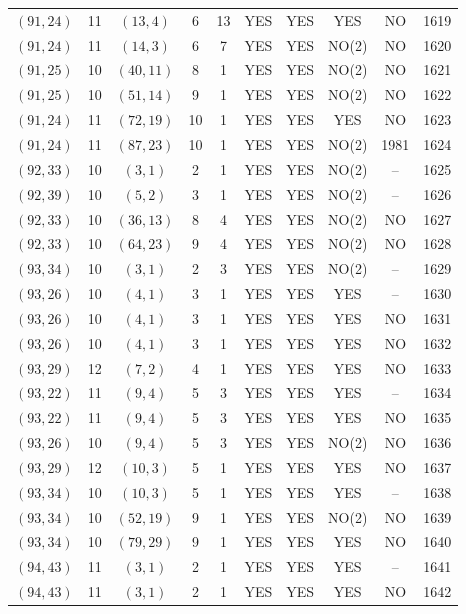 \begin{longtable}{|c|c|c|c|c|c|c|c|c|c|}
$(91, 24)$ & 11 & $(13, 4)$ & 6 & 13 & YES & YES & YES & NO & 1619\\
$(91, 24)$ & 11 & $(14, 3)$ & 6 & 7 & YES & YES & NO(2) & NO & 1620\\
$(91, 25)$ & 10 & $(40, 11)$ & 8 & 1 & YES & YES & NO(2) & NO & 1621\\
$(91, 25)$ & 10 & $(51, 14)$ & 9 & 1 & YES & YES & NO(2) & NO & 1622\\
$(91, 24)$ & 11 & $(72, 19)$ & 10 & 1 & YES & YES & YES & NO & 1623\\
$(91, 24)$ & 11 & $(87, 23)$ & 10 & 1 & YES & YES & NO(2) & 1981 & 1624\\
$(92, 33)$ & 10 & $(3, 1)$ & 2 & 1 & YES & YES & NO(2) & -- & 1625\\
$(92, 39)$ & 10 & $(5, 2)$ & 3 & 1 & YES & YES & NO(2) & -- & 1626\\
$(92, 33)$ & 10 & $(36, 13)$ & 8 & 4 & YES & YES & NO(2) & NO & 1627\\
$(92, 33)$ & 10 & $(64, 23)$ & 9 & 4 & YES & YES & NO(2) & NO & 1628\\
$(93, 34)$ & 10 & $(3, 1)$ & 2 & 3 & YES & YES & NO(2) & -- & 1629\\
$(93, 26)$ & 10 & $(4, 1)$ & 3 & 1 & YES & YES & YES & -- & 1630\\
$(93, 26)$ & 10 & $(4, 1)$ & 3 & 1 & YES & YES & YES & NO & 1631\\
$(93, 26)$ & 10 & $(4, 1)$ & 3 & 1 & YES & YES & YES & NO & 1632\\
$(93, 29)$ & 12 & $(7, 2)$ & 4 & 1 & YES & YES & YES & NO & 1633\\
$(93, 22)$ & 11 & $(9, 4)$ & 5 & 3 & YES & YES & YES & -- & 1634\\
$(93, 22)$ & 11 & $(9, 4)$ & 5 & 3 & YES & YES & YES & NO & 1635\\
$(93, 26)$ & 10 & $(9, 4)$ & 5 & 3 & YES & YES & NO(2) & NO & 1636\\
$(93, 29)$ & 12 & $(10, 3)$ & 5 & 1 & YES & YES & YES & NO & 1637\\
$(93, 34)$ & 10 & $(10, 3)$ & 5 & 1 & YES & YES & YES & -- & 1638\\
$(93, 34)$ & 10 & $(52, 19)$ & 9 & 1 & YES & YES & NO(2) & NO & 1639\\
$(93, 34)$ & 10 & $(79, 29)$ & 9 & 1 & YES & YES & YES & NO & 1640\\
$(94, 43)$ & 11 & $(3, 1)$ & 2 & 1 & YES & YES & YES & -- & 1641\\
$(94, 43)$ & 11 & $(3, 1)$ & 2 & 1 & YES & YES & YES & NO & 1642\\

\end{longtable}
